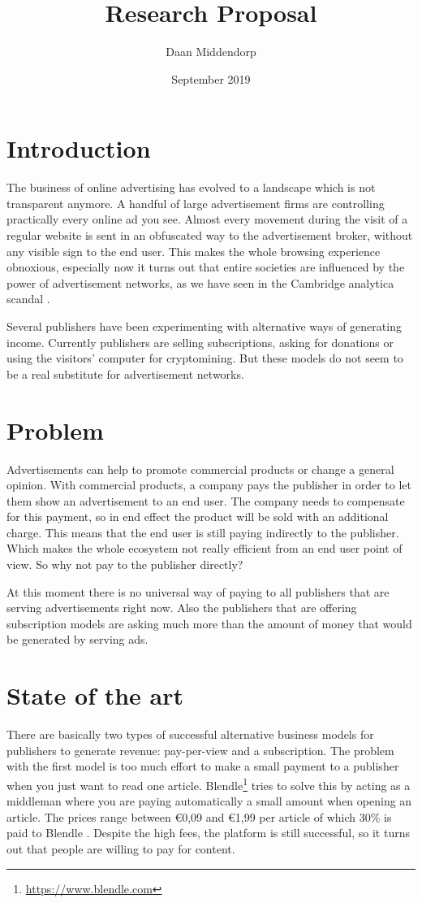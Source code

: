 \documentclass[]{article}
\title{Research Proposal}
\author{Daan Middendorp}
\date{September 2019}
\begin{document}
\maketitle

\section{Introduction}
The business of online advertising has evolved to a landscape which is not transparent anymore. A handful of large advertisement firms are controlling practically every online ad you see. Almost every movement during the visit of a regular website is sent in an obfuscated way to the advertisement broker, without any visible sign to the end user. This makes the whole browsing experience obnoxious, especially now it turns out that entire societies are influenced by the power of advertisement networks, as we have seen in the Cambridge analytica scandal .

Several publishers have been experimenting with alternative ways of generating income. Currently publishers are selling subscriptions, asking for donations or using the visitors' computer for cryptomining. But these models do not seem to be a real substitute for advertisement networks.

\section{Problem}
Advertisements can help to promote commercial products or change a general opinion. With commercial products, a company pays the publisher in order to let them show an advertisement to an end user. The company needs to compensate for this payment, so in end effect the product will be sold with an additional charge. This means that the end user is still paying indirectly to the publisher. Which makes the whole ecosystem not really efficient from an end user point of view. So why not pay to the publisher directly?

At this moment there is no universal way of paying to all publishers that are serving advertisements right now. Also the publishers that are offering subscription models are asking much more than the amount of money that would be generated by serving ads.

\section{State of the art}
There are basically two types of successful alternative business models for publishers to generate revenue: pay-per-view and a subscription. The problem with the first model is too much effort to make a small payment to a publisher when you just want to read one article. Blendle\footnote{\url{https://www.blendle.com}} tries to solve this by acting as a middleman where you are paying automatically a small amount when opening an article. The prices range between €0,09 and €1,99 per article of which 30\% is paid to Blendle . Despite the high fees, the platform is still successful, so it turns out that people are willing to pay for content.
\end{document}
